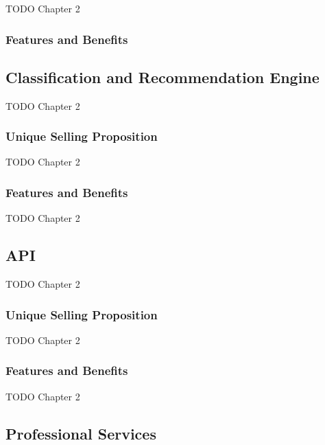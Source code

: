 TODO Chapter 2

\subsubsection*{Features and Benefits}


\subsection{Classification and Recommendation Engine}

TODO Chapter 2

\subsubsection*{Unique Selling Proposition}

TODO Chapter 2

\subsubsection*{Features and Benefits}

TODO Chapter 2


\subsection{API}

TODO Chapter 2

\subsubsection*{Unique Selling Proposition}

TODO Chapter 2

\subsubsection*{Features and Benefits}

TODO Chapter 2


\subsection{Professional Services}


